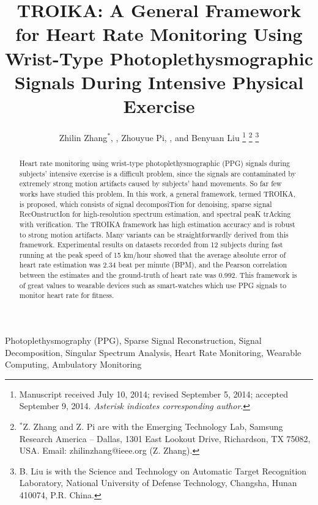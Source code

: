 \documentclass[10pt,twocolumn]{IEEEtran}
\begin{document}
\title{TROIKA: A General Framework for Heart Rate Monitoring Using Wrist-Type Photoplethysmographic Signals During Intensive Physical Exercise}

\author{Zhilin Zhang$^*$, , Zhouyue Pi, , and Benyuan Liu
\thanks{Manuscript received July 10, 2014; revised September 5, 2014; accepted September 9, 2014. \emph{Asterisk indicates corresponding author}.}
\thanks{$^*$Z. Zhang and Z. Pi are with the Emerging Technology Lab, Samsung Research America -- Dallas, 1301 East Lookout Drive, Richardson, TX 75082, USA. Email: zhilinzhang@ieee.org (Z. Zhang). }
\thanks{B. Liu is with the Science and Technology on Automatic Target Recognition Laboratory, National University of Defense Technology, Changsha, Hunan 410074, P.R. China. }
}




\maketitle


\begin{abstract}

Heart rate monitoring using wrist-type photoplethysmographic (PPG) signals during subjects' intensive exercise is a difficult problem, since the signals are contaminated by extremely strong motion artifacts caused by subjects' hand movements. So far few works have studied this problem. In this work, a general framework, termed TROIKA, is proposed, which consists of signal decomposiTion for denoising, sparse signal RecOnstructIon for high-resolution spectrum estimation, and spectral peaK trAcking with verification.
The TROIKA framework has high estimation accuracy and is robust to strong motion artifacts. Many variants can be straightforwardly derived from this framework. Experimental results on datasets recorded from 12 subjects during fast running at the peak speed of 15 km/hour showed that the average absolute error of heart rate estimation was 2.34 beat per minute (BPM), and the Pearson correlation between the estimates and the ground-truth of heart rate was 0.992. This framework is of great values to wearable devices such as smart-watches which use PPG signals to monitor heart rate for fitness.
\end{abstract}


\begin{keywords}
Photoplethysmography (PPG), Sparse Signal Reconstruction, Signal Decomposition, Singular Spectrum Analysis, Heart Rate Monitoring, Wearable Computing, Ambulatory Monitoring
\end{keywords}
\end{document}
